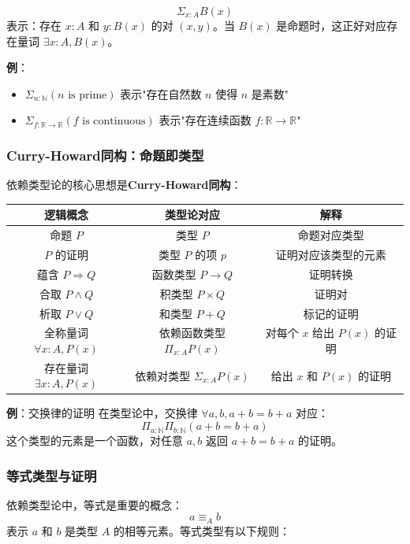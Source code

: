 \documentclass[12pt,a4paper,UTF8]{ctexart}
\begin{document}
$$\Sigma_{x:A} B(x)$$
表示：存在 $x:A$ 和 $y:B(x)$ 的对 $(x,y)$。当 $B(x)$ 是命题时，这正好对应存在量词 $\exists x:A, B(x)$。

\textbf{例}：
\begin{itemize}
    \item $\Sigma_{n:\mathbb{N}} (\text{$n$ is prime})$ 表示"存在自然数 $n$ 使得 $n$ 是素数"
    \item $\Sigma_{f:\mathbb{R}\to\mathbb{R}} (\text{$f$ is continuous})$ 表示"存在连续函数 $f:\mathbb{R}\to\mathbb{R}$"
\end{itemize}

\subsubsection{Curry-Howard同构：命题即类型}

依赖类型论的核心思想是\textbf{Curry-Howard同构}：

\begin{table}[ht]
\centering
\begin{tabular}{|c|c|c|}
\hline
逻辑概念 & 类型论对应 & 解释 \\
\hline
命题 $P$ & 类型 $P$ & 命题对应类型 \\
\hline
$P$ 的证明 & 类型 $P$ 的项 $p$ & 证明对应该类型的元素 \\
\hline
蕴含 $P \Rightarrow Q$ & 函数类型 $P \to Q$ & 证明转换 \\
\hline
合取 $P \land Q$ & 积类型 $P \times Q$ & 证明对 \\
\hline
析取 $P \lor Q$ & 和类型 $P + Q$ & 标记的证明 \\
\hline
全称量词 $\forall x:A, P(x)$ & 依赖函数类型 $\Pi_{x:A} P(x)$ & 对每个 $x$ 给出 $P(x)$ 的证明 \\
\hline
存在量词 $\exists x:A, P(x)$ & 依赖对类型 $\Sigma_{x:A} P(x)$ & 给出 $x$ 和 $P(x)$ 的证明 \\
\hline
\end{tabular}
\end{table}

\textbf{例}：交换律的证明
在类型论中，交换律 $\forall a,b, a+b = b+a$ 对应：
$$\Pi_{a:\mathbb{N}} \Pi_{b:\mathbb{N}} (a+b = b+a)$$
这个类型的元素是一个函数，对任意 $a,b$ 返回 $a+b = b+a$ 的证明。

\subsubsection{等式类型与证明}

依赖类型论中，等式是重要的概念：
$$a \equiv_A b$$
表示 $a$ 和 $b$ 是类型 $A$ 的相等元素。等式类型有以下规则：
\end{document}
